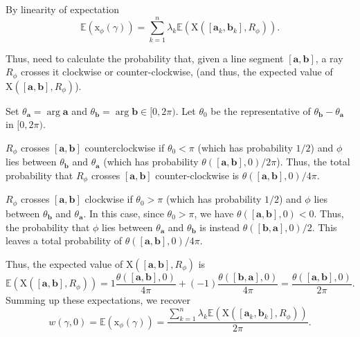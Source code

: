 \documentclass[12 pt, letterpaper]{hmcpset}
\begin{document}
\begin{solution}
	By linearity of expectation
	\[
		\mathbb{E}(\mathrm{x}_{\phi}(\gamma)) = \sum_{k = 1}^{n} \lambda_{k} \mathbb{E}(\mathrm{X}([\mathbf{a}_{k}, \mathbf{b}_{k}], R_{\phi})).
	\]

	Thus, need to calculate the probability that, given a line segment $[\mathbf{a}, \mathbf{b}]$, a ray $R_{\phi}$ crosses it clockwise or counter-clockwise, (and thus, the expected value of $\mathrm{X}([\mathbf{a}, \mathbf{b}], R_{\phi})$).

	Set $\theta_{\mathbf{a}} = {\operatorname{arg}} \mathbf{a}$ and $\theta_{\mathbf{b}} = {\operatorname{arg}} \mathbf{b} \in [0, 2 \pi)$. Let $\theta_{0}$ be the representative of $\theta_{\mathbf{b}} - \theta_{\mathbf{a}}$ in $[0, 2 \pi)$.

	$R_{\phi}$ crosses $[\mathbf{a}, \mathbf{b}]$ counterclockwise if $\theta_{0} < \pi$ (which has probability $1 / 2$) and $\phi$ lies between $\theta_{\mathbf{b}}$ and $\theta_{\mathbf{a}}$ (which has probability $\theta([\mathbf{a}, \mathbf{b}], 0) / 2 \pi$). Thus, the total probability that $R_{\phi}$ crosses $[\mathbf{a}, \mathbf{b}]$ counter-clockwise is $\theta([\mathbf{a}, \mathbf{b}], 0) / 4 \pi$.

	$R_{\phi}$ crosses $[\mathbf{a}, \mathbf{b}]$ clockwise if $\theta_{0} > \pi$ (which has probability $1 / 2$) and $\phi$ lies between $\theta_{\mathbf{b}}$ and $\theta_{\mathbf{a}}$. In this case, since $\theta_{0} > \pi$, we have $\theta([\mathbf{a}, \mathbf{b}], 0) < 0$. Thus, the probability that $\phi$ lies between $\theta_{\mathbf{a}}$ and $\theta_{\mathbf{b}}$ is instead $\theta([\mathbf{b}, \mathbf{a}], 0) / 2$. This leaves a total probability of $\theta([\mathbf{a}, \mathbf{b}], 0) / 4 \pi$.

	Thus, the expected value of $\mathrm{X}([\mathbf{a}, \mathbf{b}], R_{\phi})$ is
	\[
		\mathbb{E}(\mathrm{X}([\mathbf{a}, \mathbf{b}], R_{\phi})) = 1 \frac{\theta([\mathbf{a}, \mathbf{b}], 0)}{4 \pi} + (-1) \frac{\theta([\mathbf{b}, \mathbf{a}], 0)}{4 \pi} = \frac{\theta([\mathbf{a}, \mathbf{b}], 0)}{2 \pi}.
	\]
	Summing up these expectations, we recover
	\[
		w(\gamma, 0) = \mathbb{E}(\mathrm{x}_{\phi}(\gamma)) = \frac{\sum_{k = 1}^{n} \lambda_{k} \mathbb{E}(\mathrm{X}([\mathbf{a}_{k}, \mathbf{b}_{k}], R_{\phi}))}{2 \pi}.
	\]
\end{solution}

\pagebreak
\end{document}
